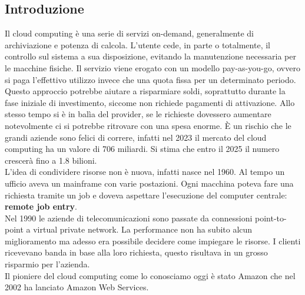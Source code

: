 \documentclass[12pt]{article}
\begin{document}
\subsection{Introduzione}
Il cloud computing è una serie di servizi on-demand, generalmente di archiviazione 
e potenza di calcola. 
L'utente cede, in parte o totalmente, il controllo sul sistema a sua disposizione, 
evitando la manutenzione necessaria per le macchine fisiche.
Il servizio viene erogato con un modello pay-as-you-go, ovvero si paga l'effettivo 
utilizzo invece che una quota fissa per un determinato periodo. 
Questo approccio potrebbe aiutare a risparmiare soldi, soprattutto durante 
la fase iniziale di investimento, siccome non richiede pagamenti di attivazione.
Allo stesso tempo si è in balìa del provider, se le richieste dovessero 
aumentare notevolmente ci si potrebbe ritrovare con una spesa enorme.
È un rischio che le grandi aziende sono felici di correre, infatti nel 2023 il 
mercato del cloud computing ha un valore di 706 miliardi. Si stima che entro il 
2025 il numero crescerà fino a 1.8 bilioni. 
\\ L'idea di condividere risorse non è nuova, infatti nasce nel 1960. Al tempo 
un ufficio aveva un mainframe con varie postazioni. Ogni macchina poteva fare 
una richiesta tramite un job e doveva aspettare l'esecuzione del computer 
centrale: \textbf{remote job entry}.
\\ Nel 1990 le aziende di telecomunicazioni sono passate da connessioni 
point-to-point a virtual private network.
La performance non ha subito alcun miglioramento ma adesso era possibile 
decidere come impiegare le risorse. I clienti ricevevano banda in base 
alla loro richiesta, questo risultava in un grosso risparmio per l'azienda.
\\ Il pioniere del cloud computing come lo conosciamo oggi è stato Amazon che 
nel 2002 ha lanciato Amazon Web Services.
\end{document}
